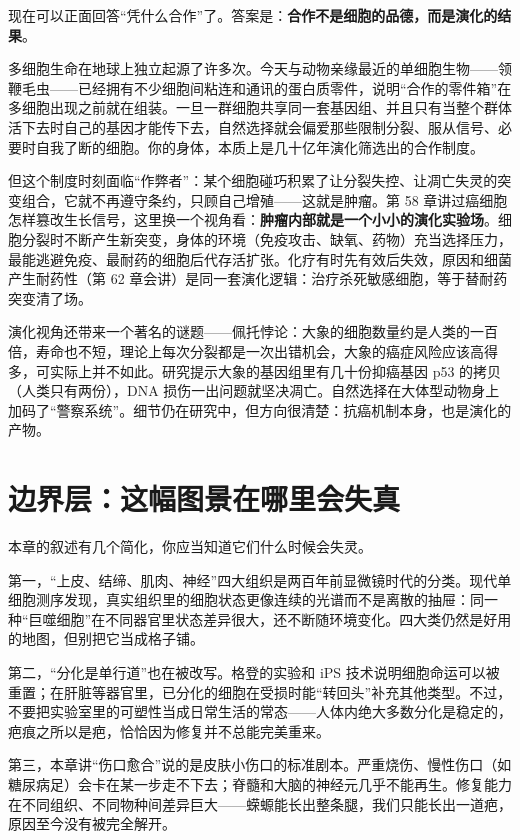现在可以正面回答“凭什么合作”了。答案是：\textbf{合作不是细胞的品德，而是演化的结果}。

多细胞生命在地球上独立起源了许多次。今天与动物亲缘最近的单细胞生物——领鞭毛虫——已经拥有不少细胞间粘连和通讯的蛋白质零件，说明“合作的零件箱”在多细胞出现之前就在组装。一旦一群细胞共享同一套基因组、并且只有当整个群体活下去时自己的基因才能传下去，自然选择就会偏爱那些限制分裂、服从信号、必要时自我了断的细胞。你的身体，本质上是几十亿年演化筛选出的合作制度。

但这个制度时刻面临“作弊者”：某个细胞碰巧积累了让分裂失控、让凋亡失灵的突变组合，它就不再遵守条约，只顾自己增殖——这就是肿瘤。第 58 章讲过癌细胞怎样篡改生长信号，这里换一个视角看：\textbf{肿瘤内部就是一个小小的演化实验场}。细胞分裂时不断产生新突变，身体的环境（免疫攻击、缺氧、药物）充当选择压力，最能逃避免疫、最耐药的细胞后代存活扩张。化疗有时先有效后失效，原因和细菌产生耐药性（第 62 章会讲）是同一套演化逻辑：治疗杀死敏感细胞，等于替耐药突变清了场。

演化视角还带来一个著名的谜题——佩托悖论：大象的细胞数量约是人类的一百倍，寿命也不短，理论上每次分裂都是一次出错机会，大象的癌症风险应该高得多，可实际上并不如此。研究提示大象的基因组里有几十份抑癌基因 p53 的拷贝（人类只有两份），DNA 损伤一出问题就坚决凋亡。自然选择在大体型动物身上加码了“警察系统”。细节仍在研究中，但方向很清楚：抗癌机制本身，也是演化的产物。

\section{边界层：这幅图景在哪里会失真}

本章的叙述有几个简化，你应当知道它们什么时候会失灵。

第一，“上皮、结缔、肌肉、神经”四大组织是两百年前显微镜时代的分类。现代单细胞测序发现，真实组织里的细胞状态更像连续的光谱而不是离散的抽屉：同一种“巨噬细胞”在不同器官里状态差异很大，还不断随环境变化。四大类仍然是好用的地图，但别把它当成格子铺。

第二，“分化是单行道”也在被改写。格登的实验和 iPS 技术说明细胞命运可以被重置；在肝脏等器官里，已分化的细胞在受损时能“转回头”补充其他类型。不过，不要把实验室里的可塑性当成日常生活的常态——人体内绝大多数分化是稳定的，疤痕之所以是疤，恰恰因为修复并不总能完美重来。

第三，本章讲“伤口愈合”说的是皮肤小伤口的标准剧本。严重烧伤、慢性伤口（如糖尿病足）会卡在某一步走不下去；脊髓和大脑的神经元几乎不能再生。修复能力在不同组织、不同物种间差异巨大——蝾螈能长出整条腿，我们只能长出一道疤，原因至今没有被完全解开。

